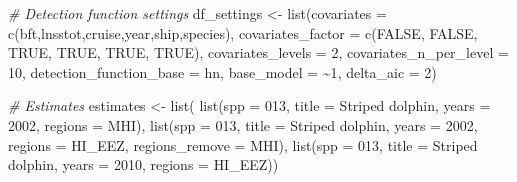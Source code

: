 \documentclass[
]{book}
\newenvironment{Shaded}{\begin{snugshade}}{\end{snugshade}}
\newcommand{\AttributeTok}[1]{\textcolor[rgb]{0.77,0.63,0.00}{#1}}
\newcommand{\CommentTok}[1]{\textcolor[rgb]{0.56,0.35,0.01}{\textit{#1}}}
\newcommand{\ConstantTok}[1]{\textcolor[rgb]{0.00,0.00,0.00}{#1}}
\newcommand{\DecValTok}[1]{\textcolor[rgb]{0.00,0.00,0.81}{#1}}
\newcommand{\FunctionTok}[1]{\textcolor[rgb]{0.00,0.00,0.00}{#1}}
\newcommand{\NormalTok}[1]{#1}
\newcommand{\OtherTok}[1]{\textcolor[rgb]{0.56,0.35,0.01}{#1}}
\newcommand{\StringTok}[1]{\textcolor[rgb]{0.31,0.60,0.02}{#1}}
\begin{document}
\begin{Shaded}
\begin{Highlighting}[]
\CommentTok{\# Detection function settings}
\NormalTok{df\_settings }\OtherTok{\textless{}{-}} \FunctionTok{list}\NormalTok{(}\AttributeTok{covariates =} \FunctionTok{c}\NormalTok{(}\StringTok{\textquotesingle{}bft\textquotesingle{}}\NormalTok{,}\StringTok{\textquotesingle{}lnsstot\textquotesingle{}}\NormalTok{,}\StringTok{\textquotesingle{}cruise\textquotesingle{}}\NormalTok{,}\StringTok{\textquotesingle{}year\textquotesingle{}}\NormalTok{,}\StringTok{\textquotesingle{}ship\textquotesingle{}}\NormalTok{,}\StringTok{\textquotesingle{}species\textquotesingle{}}\NormalTok{),}
                   \AttributeTok{covariates\_factor =} \FunctionTok{c}\NormalTok{(}\ConstantTok{FALSE}\NormalTok{, }\ConstantTok{FALSE}\NormalTok{, }\ConstantTok{TRUE}\NormalTok{, }\ConstantTok{TRUE}\NormalTok{, }\ConstantTok{TRUE}\NormalTok{, }\ConstantTok{TRUE}\NormalTok{),}
                   \AttributeTok{covariates\_levels =} \DecValTok{2}\NormalTok{,}
                   \AttributeTok{covariates\_n\_per\_level =} \DecValTok{10}\NormalTok{,}
                   \AttributeTok{detection\_function\_base =} \StringTok{\textquotesingle{}hn\textquotesingle{}}\NormalTok{,}
                   \AttributeTok{base\_model =} \StringTok{\textquotesingle{}\textasciitilde{}1\textquotesingle{}}\NormalTok{,}
                   \AttributeTok{delta\_aic =} \DecValTok{2}\NormalTok{)}

\CommentTok{\# Estimates}
\NormalTok{estimates }\OtherTok{\textless{}{-}} \FunctionTok{list}\NormalTok{(}
    \FunctionTok{list}\NormalTok{(}\AttributeTok{spp =} \StringTok{\textquotesingle{}013\textquotesingle{}}\NormalTok{,}
         \AttributeTok{title =} \StringTok{\textquotesingle{}Striped dolphin\textquotesingle{}}\NormalTok{,}
         \AttributeTok{years =} \DecValTok{2002}\NormalTok{,}
         \AttributeTok{regions =} \StringTok{\textquotesingle{}MHI\textquotesingle{}}\NormalTok{),}
    \FunctionTok{list}\NormalTok{(}\AttributeTok{spp =} \StringTok{\textquotesingle{}013\textquotesingle{}}\NormalTok{,}
         \AttributeTok{title =} \StringTok{\textquotesingle{}Striped dolphin\textquotesingle{}}\NormalTok{,}
         \AttributeTok{years =} \DecValTok{2002}\NormalTok{,}
         \AttributeTok{regions =} \StringTok{\textquotesingle{}HI\_EEZ\textquotesingle{}}\NormalTok{,}
         \AttributeTok{regions\_remove =} \StringTok{\textquotesingle{}MHI\textquotesingle{}}\NormalTok{),}
    \FunctionTok{list}\NormalTok{(}\AttributeTok{spp =} \StringTok{\textquotesingle{}013\textquotesingle{}}\NormalTok{,}
         \AttributeTok{title =} \StringTok{\textquotesingle{}Striped dolphin\textquotesingle{}}\NormalTok{,}
         \AttributeTok{years =} \DecValTok{2010}\NormalTok{,}
         \AttributeTok{regions =} \StringTok{\textquotesingle{}HI\_EEZ\textquotesingle{}}\NormalTok{))}


\end{Highlighting}
\end{Shaded}
\end{document}
